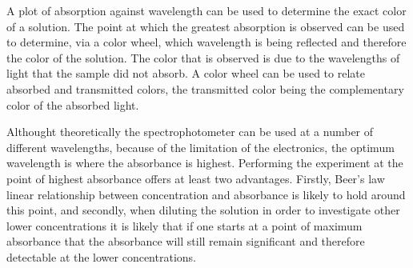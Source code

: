 \documentclass[../chem.tex]{subfiles}
\begin{document}
A plot of absorption against wavelength can be used to determine the exact color of a solution. The point at which the greatest absorption is observed can be used to determine,
via a color wheel, which wavelength is being reflected and therefore the color of the solution. The color that is observed is due to the wavelengths of light 
that the sample did not absorb. A color wheel can be used to relate absorbed and transmitted colors, the transmitted color being the 
complementary color of the absorbed light.

Althought theoretically the spectrophotometer can be used at a number of different wavelengths, because of the limitation of the electronics, 
the optimum wavelength is where the absorbance is highest. Performing the experiment at the point of highest absorbance offers at least two advantages.
Firstly, Beer's law linear relationship between concentration and absorbance is likely to hold around this point, and secondly, when diluting 
the solution in order to investigate other lower concentrations it is likely that if one starts at a point of maximum absorbance that the 
absorbance will still remain significant and therefore detectable at the lower concentrations.
\end{document}
